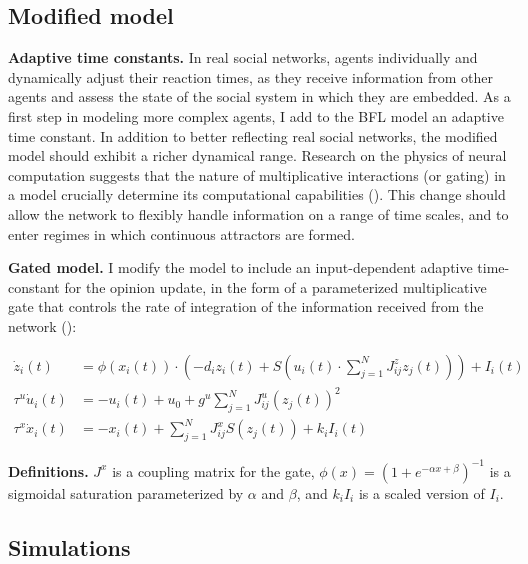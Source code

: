 \documentclass[]{article}
\begin{document}
\subsection{Modified model}

\textbf{Adaptive time constants.} In real social networks, agents individually and dynamically adjust their reaction times, as they receive information from other agents and assess the state of the social system in which they are embedded. As a first step in modeling more complex agents, I add to the BFL model an adaptive time constant. In addition to better reflecting real social networks, the modified model should exhibit a richer dynamical range. Research on the physics of neural computation suggests that the nature of multiplicative interactions (or gating) in a model crucially determine its computational capabilities (\cite{krishnamurthyTheoryGatingRecurrent2022}). This change should allow the network to flexibly handle information on a range of time scales, and to enter regimes in which continuous attractors are formed. 

\textbf{Gated model.} I modify the model to include an input-dependent adaptive time-constant for the opinion update, in the form of a parameterized multiplicative gate that controls the rate of integration of the information received from the network (\cite{krishnamurthyTheoryGatingRecurrent2022}):

\begin{align}
	\dot{z}_{i}(t) &= \phi \left( x_i(t) \right) \cdot \left( -d_{i}z_{i}(t) + S \left( u_i(t) \cdot  \sum^{N}_{j=1} J^z_{ij}z_{j}(t)  \right) \right) + I_{i}(t) \\
	\tau^u \dot{u}_i(t) &=  -u_i(t)+u_0+g^u \sum ^{N}_{j=1} J^u_{ij}(z_{j}(t))^2 \\
	\tau^x \dot{x}_i(t) &= -x_i(t) +  \sum ^{N}_{j=1} J^x_{ij} S(z_j(t)) + k_i I_i(t)
\end{align}

\textbf{Definitions.} $J^x$ is a coupling matrix for the gate, $\phi (x) = (1 + e^{- \alpha x + \beta })^{-1}$ is a sigmoidal saturation parameterized by $\alpha$ and $\beta$, and $k_i I_i$ is a scaled version of $I_i$.

\subsection{Simulations}
\end{document}
